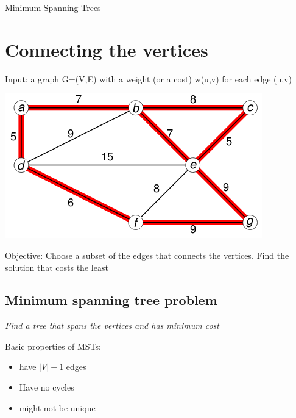 \documentclass{article}[18pt]
\begin{document}
\begin{center}
\underline{\huge Minimum Spanning Trees}
\end{center}
\section{Connecting the vertices}
Input: a graph G=(V,E) with a weight (or a cost) w(u,v) for each edge (u,v)
\begin{center}
	\includegraphics[scale=0.7]{graph1}
\end{center}
Objective: Choose a subset of the edges that connects the vertices. Find the solution that costs the least
\subsection{Minimum spanning tree problem}
\begin{center}
	\textit{Find a tree that spans the vertices and has minimum cost}
\end{center}
Basic properties of MSTs:
\begin{itemize}
	\item have $|V|-1$ edges
	\item Have no cycles
	\item might not be unique
\end{itemize}
\end{document}
